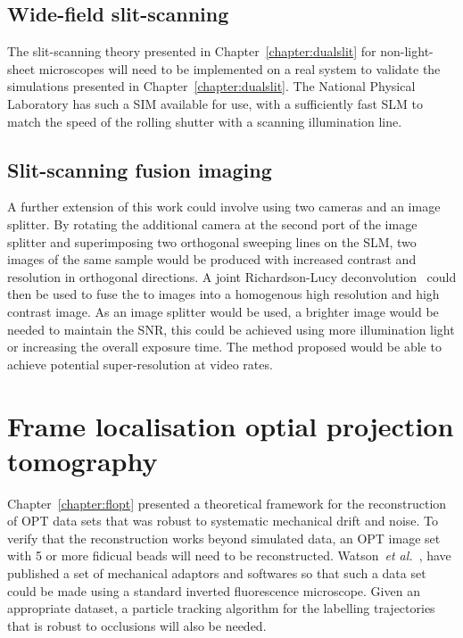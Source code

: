 \subsection{Wide-field slit-scanning}

The slit-scanning theory presented in Chapter~\ref{chapter:dualslit} for non-light-sheet microscopes will need to be implemented on a real system to validate the simulations presented in Chapter~\ref{chapter:dualslit}.
The National Physical Laboratory has such a \gls{SIM} available for use, with a sufficiently fast \gls{SLM} to match the speed of the rolling shutter with a scanning illumination line.

\subsection{Slit-scanning fusion imaging}
A further extension of this work could involve using two cameras and an image splitter.
By rotating the additional camera at the second port of the image splitter and superimposing two orthogonal sweeping lines on the \gls{SLM}, two images of the same sample would be produced with increased contrast and resolution in orthogonal directions.
A joint Richardson-Lucy deconvolution~\cite{ingaramoRichardsonLucyDeconvolution2014} could then be used to fuse the to images into a homogenous high resolution and high contrast image.
As an image splitter would be used, a brighter image would be needed to maintain the \gls{SNR}, this could be achieved using more illumination light or increasing the overall exposure time.
The method proposed would be able to achieve potential super-resolution at video rates.

\section{Frame localisation optial projection tomography}

Chapter~\ref{chapter:flopt} presented a theoretical framework for the reconstruction of \gls{OPT} data sets that was robust to systematic mechanical drift and noise.
To verify that the reconstruction works beyond simulated data, an \gls{OPT} image set with 5 or more fidicual beads will need to be reconstructed.
Watson~\emph{et al.}~\cite{watsonOPTiMOpticalProjection2017}, have published a set of mechanical adaptors and softwares so that such a data set could be made using a standard inverted fluorescence microscope.
Given an appropriate dataset, a particle tracking algorithm for the labelling trajectories that is robust to occlusions will also be needed.

